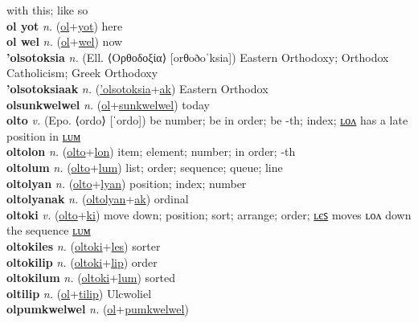 with this; like so \label{ol uat} \\
\textbf{ol yot} \textit{n.} (\hyperref[ol]{ol}+\hyperref[yot]{yot})
here \label{ol yot} \\
\textbf{ol wel} \textit{n.} (\hyperref[ol]{ol}+\hyperref[wel]{wel})
now \label{ol wel} \\
\textbf{'olsotoksia} \textit{n.} (Ell. ⟨Ορθοδοξία⟩ [orθoðoˈksia])
Eastern Orthodoxy; Orthodox Catholicism; Greek Orthodoxy \label{'olsotoksia} \\
\textbf{'olsotoksiaak} \textit{n.} (\hyperref['olsotoksia]{'olsotoksia}+\hyperref[ak]{ak})
Eastern Orthodox \label{'olsotoksiaak} \\
\textbf{olsunkwelwel} \textit{n.} (\hyperref[ol]{ol}+\hyperref[sunkwelwel]{sunkwelwel})
today \label{olsunkwelwel} \\
\textbf{olto} \textit{v.} (Epo. ⟨ordo⟩ [ˈordo])
be number; be in order; be -th; index; \hyperref[oltolon]{ʟᴏᴧ} has a late position in \hyperref[oltolum]{ʟᴜᴍ} \label{olto} \\
\textbf{oltolon} \textit{n.} (\hyperref[olto]{olto}+\hyperref[lon]{lon})
item; element; number; in order; -th \label{oltolon} \\
\textbf{oltolum} \textit{n.} (\hyperref[olto]{olto}+\hyperref[lum]{lum})
list; order; sequence; queue; line \label{oltolum} \\
\textbf{oltolyan} \textit{n.} (\hyperref[olto]{olto}+\hyperref[lyan]{lyan})
position; index; number \label{oltolyan} \\
\textbf{oltolyanak} \textit{n.} (\hyperref[oltolyan]{oltolyan}+\hyperref[ak]{ak})
ordinal \label{oltolyanak} \\
\textbf{oltoki} \textit{v.} (\hyperref[olto]{olto}+\hyperref[ki]{ki})
move down; position; sort; arrange; order; \hyperref[oltokiles]{ʟєꜱ} moves ʟᴏᴧ down the sequence \hyperref[oltokilum]{ʟᴜᴍ} \label{oltoki} \\
\textbf{oltokiles} \textit{n.} (\hyperref[oltoki]{oltoki}+\hyperref[les]{les})
sorter \label{oltokiles} \\
\textbf{oltokilip} \textit{n.} (\hyperref[oltoki]{oltoki}+\hyperref[lip]{lip})
order \label{oltokilip} \\
\textbf{oltokilum} \textit{n.} (\hyperref[oltoki]{oltoki}+\hyperref[lum]{lum})
sorted \label{oltokilum} \\
\textbf{oltilip} \textit{n.} (\hyperref[ol]{ol}+\hyperref[tilip]{tilip})
Ulcwoliel \label{oltilip} \\
\textbf{olpumkwelwel} \textit{n.} (\hyperref[ol]{ol}+\hyperref[pumkwelwel]{pumkwelwel})
